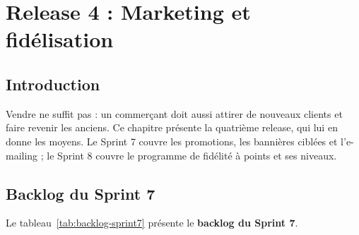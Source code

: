 \thispagestyle{fancy}
\chapter{Release 4 : Marketing et fidélisation}
\section*{Introduction}
Vendre ne suffit pas : un commerçant doit aussi attirer de nouveaux clients et faire revenir les anciens. Ce chapitre présente la quatrième release, qui lui en donne les moyens. Le Sprint 7 couvre les promotions, les bannières ciblées et l'e-mailing ; le Sprint 8 couvre le programme de fidélité à points et ses niveaux.

\section{Backlog du Sprint 7}
Le tableau~\ref{tab:backlog-sprint7} présente le \textbf{backlog du Sprint 7}.

